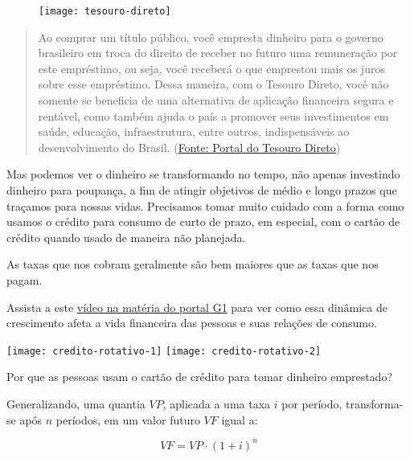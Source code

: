 \begin{figure}[H]

\centering
\texttt{[image: tesouro-direto]}
\end{figure}
\vspace{-1em}
\begin{quote}
Ao comprar um título público, você empresta dinheiro para o governo brasileiro em troca do direito de receber no futuro uma remuneração por este empréstimo, ou seja, você receberá o que emprestou mais os juros sobre esse empréstimo. Dessa maneira, com o Tesouro Direto, você não somente se beneficia de uma alternativa de aplicação financeira segura e rentável, como também ajuda o país a promover seus investimentos em saúde, educação, infraestrutura, entre outros, indispensáveis ao desenvolvimento do Brasil. 
\flushright(\href{http://www.tesouro.gov.br/web/stn/-/conheca-o-tesouro-direto}{Fonte: Portal do Tesouro Direto})
\end{quote}
Mas podemos ver o dinheiro se transformando no tempo, não apenas investindo dinheiro para poupança, a fim de atingir objetivos de médio e longo prazos que traçamos para nossas vidas. Precisamos tomar muito cuidado com a forma como usamos o crédito para consumo de curto de prazo, em especial, com o cartão de crédito quando usado de maneira não planejada. 

\begin{observation}{}
{As taxas que nos cobram geralmente são bem maiores que as taxas que nos pagam.}
\end{observation}

\begin{reflection}
Assista a este \href{http://g1.globo.com/economia/seu-dinheiro/noticia/divida-do-cartao-de-credito-sera-parcelada.ghtml}{vídeo na matéria do portal G1} para ver como essa dinâmica de crescimento afeta a vida financeira das pessoas e suas relações de consumo.

\centering
\texttt{[image: credito-rotativo-1]}\hspace{1em}
\texttt{[image: credito-rotativo-2]}
\justify

Por que as pessoas usam o cartão de crédito para tomar dinheiro emprestado?
\end{reflection}

Generalizando, uma quantia $\mathit{VP}$, aplicada a uma taxa $i$ por período, transforma-se após $n$ períodos, em um valor futuro $\mathit{VF}$ igual a:

$$\mathit{VF}=\mathit{VP}\cdot(1+i)^n $$ 

